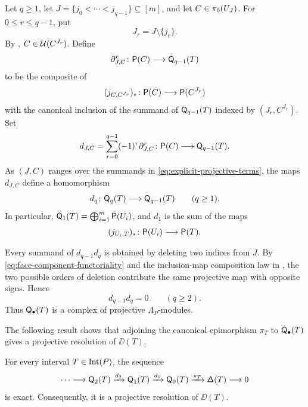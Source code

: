 Let $q\geq1$, let
$J=\{j_0<\cdots<j_{q-1}\}\subseteq[m]$,
and let $C\in\pi_0(U_J)$. For $0\leq r\leq q-1$, put
\[
J_r=J\setminus\{j_r\}.
\]
By ,
$C\in\mathcal U(C^{J_r})$. Define
\[
\partial_{J,C}^{r}
\colon
\mathsf P(C)\longrightarrow\mathsf Q_{q-1}(T)
\]
to be the composite of
\[
(j_{C,C^{J_r}})_*
\colon
\mathsf P(C)\longrightarrow\mathsf P(C^{J_r})
\]
with the canonical inclusion of the summand of $\mathsf Q_{q-1}(T)$ indexed
by $(J_r,C^{J_r})$. Set
\begin{equation}
\label{eq:explicit-projective-component-differential}
d_{J,C}
=
\sum_{r=0}^{q-1}(-1)^r\partial_{J,C}^{r}
\colon
\mathsf P(C)\longrightarrow\mathsf Q_{q-1}(T).
\end{equation}
As $(J,C)$ ranges over the summands in
\eqref{eq:explicit-projective-terms}, the maps $d_{J,C}$ define a
homomorphism
\begin{equation}
\label{eq:explicit-projective-differential}
d_q
\colon
\mathsf Q_q(T)\longrightarrow\mathsf Q_{q-1}(T)
\qquad
(q\geq1).
\end{equation}
In particular,
$\mathsf Q_1(T)=\bigoplus_{i=1}^{m}\mathsf P(U_i)$, and $d_1$ is the sum of the
maps
\[
(j_{U_i,T})_*\colon\mathsf P(U_i)\longrightarrow\mathsf P(T).
\]

Every summand of $d_{q-1}d_q$ is obtained by deleting two indices from
$J$.  By \eqref{eq:face-component-functoriality} and the inclusion-map
composition law in , the two
possible orders of deletion contribute the same projective map with
opposite signs.  Hence
\begin{equation}
\label{eq:explicit-projective-complex-condition}
d_{q-1}d_q=0
\qquad
(q\geq2).
\end{equation}
Thus $\mathsf Q_\bullet(T)$ is a complex of projective
$\Lambda_P$-modules.

The following result shows that adjoining the canonical epimorphism
$\pi_T$ to $\mathsf Q_\bullet(T)$ gives a projective resolution of $\DD(T)$.

\begin{theorem}
\label{thm:standard-projective-resolution}
For every interval $T\in\operatorname{Int}(P)$, the sequence
\begin{equation}
\label{eq:standard-projective-resolution-sequence}
\cdots
\longrightarrow
\mathsf Q_2(T)
\xrightarrow{d_2}
\mathsf Q_1(T)
\xrightarrow{d_1}
\mathsf Q_0(T)
\xrightarrow{\pi_T}
\mathsf\Delta(T)
\longrightarrow0
\end{equation}
is exact. Consequently, it is a projective resolution of
$\DD(T)$.
\end{theorem}



